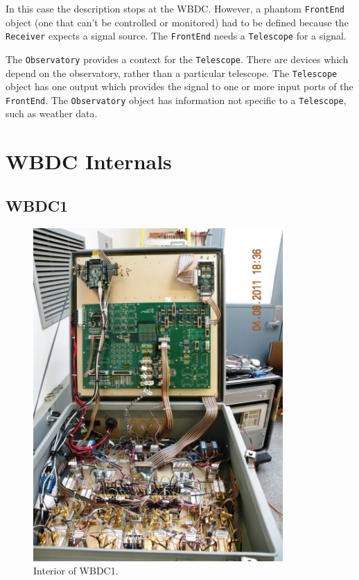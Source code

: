 \documentclass[letterpaper,11pt]{book}
\begin{document}
In this case the description stops at the WBDC.  However, a phantom 
{\tt FrontEnd} object (one that can't be controlled or monitored) had to be 
defined because the {\tt Receiver} expects a signal source.  The 
{\tt FrontEnd} needs a {\tt Telescope} for a signal.

The {\tt Observatory} provides a context for the {\tt Telescope}.  There are
devices which depend on the observatory, rather than a particular telescope.
The {\tt Telescope} object has one output which provides the signal to one or
more input ports of the {\tt FrontEnd}.  The {\tt Observatory} object has
information not specific to a {\tt Telescope}, such as weather data.


\appendix

\chapter{WBDC Internals}

\section{WBDC1}

\begin{figure}[h!tb]
  \begin{center}
    \includegraphics[height=5in]{WBDC1inside.jpg}
  \end{center}
  \caption{\label{fig:inside}Interior of WBDC1.}
\end{figure}
\end{document}
